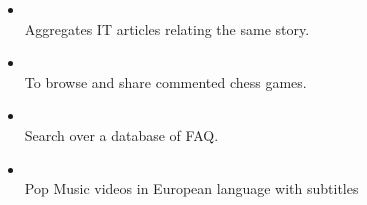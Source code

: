 %
%
%

\twocolumnsection
{
\begin{skills}
\end{skills}}
{
\vspace{1em}
\begin{itemize}
	\item {} \\Aggregates IT articles relating the same story.  	
	\item {} \\To browse and share commented chess games.
	\item {} \\Search over a database of FAQ.
	\item {} \\Pop Music videos in European language with subtitles
\end{itemize}
}
